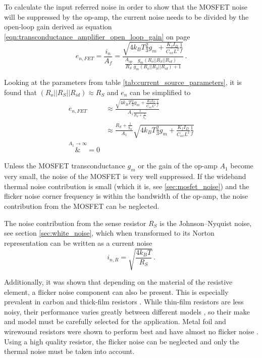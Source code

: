 To calculate the input referred noise in order to show that the MOSFET noise will be suppressed by the op-amp, the current noise needs to be divided by the open-loop gain derived as equation \ref{eqn:transconductance_amplifier_open_loop_gain} on page \pageref{eqn:transconductance_amplifier_open_loop_gain}
\begin{equation}
    e_{n,FET} = \frac{i_n}{A_f} = \frac{\sqrt{4 k_B T \frac{2}{3} g_m + \frac{K_f I_D}{C_{ox} L^2} \frac{1}{f}}}{\frac{A_{op}}{R_S} \frac{g_m \left(R_o || R_S || R_{id}\right)}{g_m \left(R_o || R_S || R_{id}\right) + 1}} \,.
\end{equation}

Looking at the parameters from table \ref{tab:current_source_parameters}, it is found that $\left(R_o || R_S || R_{id}\right) \approx R_S$ and $e_n$ can be simplified to
\begin{align*}
    e_{n,FET} &\approx \frac{\sqrt{4 k_B T \frac{2}{3} g_m + \frac{K_f I_D}{C_{ox} L^2} \frac{1}{f}}}{A_1 \frac{1}{R_S + \frac{1}{g_m}}}\\
    &\approx \frac{R_S + \frac{1}{g_m}}{A_1} \sqrt{4 k_B T \frac{2}{3} g_m + \frac{K_f I_D}{C_{ox} L^2} \frac{1}{f}}\\
    \overset{A_1 \to \infty}&{=} 0
\end{align*}

Unless the MOSFET transconductance $g_m$ or the gain of the op-amp $A_1$ become very small, the noise of the MOSFET is very well suppressed. If the wideband thermal noise contribution is small (which it is, see \ref{sec:mosfet_noise}) and the flicker noise corner frequency is within the bandwidth of the op-amp, the noise contribution from the MOSFET can be neglected.

The noise contribution from the sense resistor $R_S$ is the Johnson–Nyquist noise, see section \ref{sec:white_noise}, which when transformed to its Norton representation can be written as a current noise
\begin{equation}
    i_{n,R} = \sqrt{\frac{4 k_B T}{R_S}} \label{eqn:current_noise_resistor}\,.
\end{equation}

Additionally, it was shown that depending on the material of the resistive element, a flicker noise component can also be present. This is especially prevalent in carbon and thick-film resistors \cite{flicker_noise_carbon_film,1_f_noise_thick_film}. While thin-film resistors are less noisy, their performance varies greatly between different models \cite{resistor_current_noise_ligo}, so their make and model must be carefully selected for the application. Metal foil and wirewound resistors were shown to perform best and have almost no flicker noise \cite{resistor_current_noise_ligo,flicker_noise_foil_resistor_beev}. Using a high quality resistor, the flicker noise can be neglected and only the thermal noise must be taken into account.

